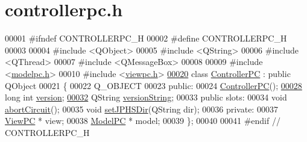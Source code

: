 \hypertarget{controllerpc_8h_source}{}\section{controllerpc.\+h}
\label{controllerpc_8h_source}

\begin{DoxyCode}
00001 \textcolor{preprocessor}{#ifndef CONTROLLERPC\_H}
00002 \textcolor{preprocessor}{#define CONTROLLERPC\_H}
00003 
00004 \textcolor{preprocessor}{#include <QObject>}
00005 \textcolor{preprocessor}{#include <QString>}
00006 \textcolor{preprocessor}{#include <QThread>}
00007 \textcolor{preprocessor}{#include <QMessageBox>}
00008 
00009 \textcolor{preprocessor}{#include <\hyperlink{modelpc_8h}{modelpc.h}>}
00010 \textcolor{preprocessor}{#include <\hyperlink{viewpc_8h}{viewpc.h}>}
\hypertarget{controllerpc_8h_source.tex_l00020}{}\hyperlink{class_controller_p_c}{00020} \textcolor{keyword}{class }\hyperlink{class_controller_p_c}{ControllerPC} : \textcolor{keyword}{public} QObject
00021 \{
00022     Q\_OBJECT
00023 \textcolor{keyword}{public}:
00024     \hyperlink{class_controller_p_c_afa6c92d67bf3b6531c42385fc5938003}{ControllerPC}();
\hypertarget{controllerpc_8h_source.tex_l00028}{}\hyperlink{class_controller_p_c_a9eb43c34237d66751a6411e55cf5f55e}{00028}     \textcolor{keywordtype}{long} \textcolor{keywordtype}{int} \hyperlink{class_controller_p_c_a9eb43c34237d66751a6411e55cf5f55e}{version};
\hypertarget{controllerpc_8h_source.tex_l00032}{}\hyperlink{class_controller_p_c_a0e63cca37d6ce2e660f3380400c2c5f3}{00032}     QString \hyperlink{class_controller_p_c_a0e63cca37d6ce2e660f3380400c2c5f3}{versionString};
00033 \textcolor{keyword}{public} slots:
00034     \textcolor{keywordtype}{void} \hyperlink{class_controller_p_c_a8814989f7be1214e06b2e720889066b0}{abortCircuit}();
00035     \textcolor{keywordtype}{void} \hyperlink{class_controller_p_c_ac00d29685a7e5b780c01eb438e10f96d}{setJPHSDir}(QString dir);
00036 \textcolor{keyword}{private}:
00037     \hyperlink{class_view_p_c}{ViewPC} * view;
00038     \hyperlink{class_model_p_c}{ModelPC} * model;
00039 \};
00040 
00041 \textcolor{preprocessor}{#endif // CONTROLLERPC\_H}
\end{DoxyCode}
